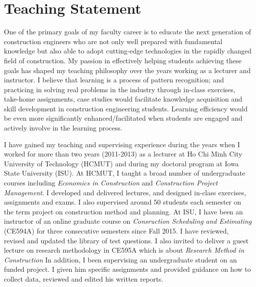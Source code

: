 \documentclass[a4paper,11pt]{article}
\begin{document}
\singlespacing
{}

\sectionfont{\sectionrule{0ex}{0pt}{-1ex}{.75pt}}

\section*{Teaching Statement}
%
One of the primary goals of my faculty career is to educate the next generation of construction engineers who are not only well prepared with fundamental knowledge but also able to adopt cutting-edge technologies in the rapidly changed field of construction. 
%
My passion in effectively helping students achieving these goals has shaped my teaching philosophy over the years working as a lecturer and instructor.
%
I believe that learning is a process of pattern recognition; and practicing in solving real problems in the industry through in-class exercises, take-home assignments, case studies would facilitate knowledge acquisition and skill development in construction engineering students. Learning efficiency would be even more significantly enhanced/facilitated when students are engaged and actively involve in the learning process.
%
%
\par
I have gained my teaching and supervising experience during the years when I worked for more than two years (2011-2013) as a lecturer at Ho Chi Minh City University of Technology (HCMUT) and during my doctoral program at Iowa State University (ISU). 
%
At HCMUT, I taught a broad number of undergraduate courses including {\sl Economics in Construction} and {\sl Construction Project Management}. I developed and delivered lectures, and designed in-class exercises, assignments and exams. I also supervised around 50 students each semester on the term project on construction method and planning. 
%
At ISU, I have been an instructor of an online graduate course on {\sl Consruction Scheduling and Estimating} (CE594A) for three consecutive semesters since Fall 2015. I have reviewed, revised and updated the library of test questions. I also invited to deliver a guest lecture on research methodology in CE595A which is about {\sl Research Method in Construction} In addition, I been supervising an undergraduate student on an funded project. I given him specific assignments and provided guidance on how to collect data, reviewed and edited his written reports. 
\end{document}
